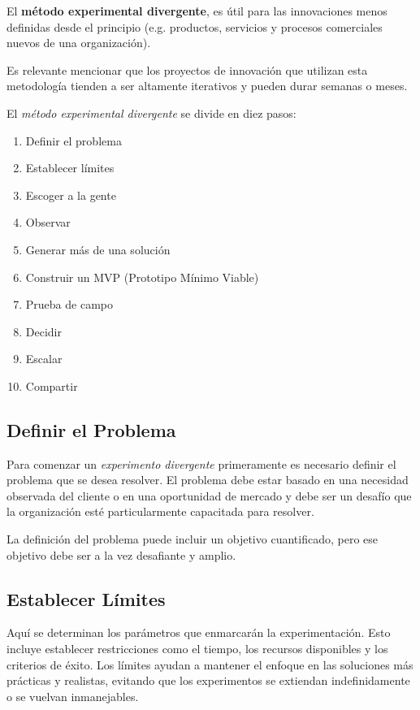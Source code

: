 	El \textbf{método experimental divergente}, es útil para las innovaciones menos
	definidas desde el principio (e.g. productos, servicios y procesos comerciales
	nuevos de una organización).

	Es relevante mencionar que los proyectos de innovación que utilizan esta
	metodología tienden a ser altamente iterativos y pueden durar semanas o meses.

	El \textit{método experimental divergente} se divide en diez pasos:

	\begin{enumerate}
		\item Definir el problema
		\item Establecer límites
		\item Escoger a la gente
		\item Observar
		\item Generar más de una solución
		\item Construir un MVP (Prototipo Mínimo Viable)
		\item Prueba de campo
		\item Decidir
		\item Escalar
		\item Compartir
	\end{enumerate}

	\subsection{Definir el Problema}

	Para comenzar un \textit{experimento divergente} primeramente es necesario
	definir el problema que se desea resolver. El problema debe estar basado en una
	necesidad observada del cliente o en una oportunidad de mercado y debe ser un
	desafío que la organización esté particularmente capacitada para resolver.

	La definición del problema puede incluir un objetivo cuantificado, pero ese
	objetivo debe ser a la vez desafiante y amplio.

	\subsection{Establecer Límites}

	Aquí se determinan los parámetros que enmarcarán la experimentación. Esto
	incluye establecer restricciones como el tiempo, los recursos disponibles y los
	criterios de éxito. Los límites ayudan a mantener el enfoque en las soluciones
	más prácticas y realistas, evitando que los experimentos se extiendan
	indefinidamente o se vuelvan inmanejables.

